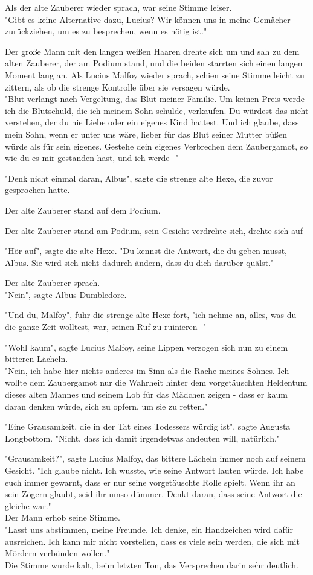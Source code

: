 {Als der alte Zauberer wieder sprach, war seine Stimme leiser.\\ "Gibt es keine Alternative dazu, Lucius? Wir können uns in meine Gemächer zurückziehen, um es zu besprechen, wenn es nötig ist."

Der große Mann mit den langen weißen Haaren drehte sich um und sah zu dem alten Zauberer, der am Podium stand, und die beiden starrten sich einen langen Moment lang an. Als Lucius Malfoy wieder sprach, schien seine Stimme leicht zu zittern, als ob die strenge Kontrolle über sie versagen würde.\\ "Blut verlangt nach Vergeltung, das Blut meiner Familie. Um keinen Preis werde ich die Blutschuld, die ich meinem Sohn schulde, verkaufen. Du würdest das nicht verstehen, der du nie Liebe oder ein eigenes Kind hattest. Und ich glaube, dass mein Sohn, wenn er unter uns wäre, lieber für das Blut seiner Mutter büßen würde als für sein eigenes. Gestehe dein eigenes Verbrechen dem Zaubergamot, so wie du es mir gestanden hast, und ich werde -"

"Denk nicht einmal daran, Albus", sagte die strenge alte Hexe, die zuvor gesprochen hatte.

Der alte Zauberer stand auf dem Podium.

Der alte Zauberer stand am Podium, sein Gesicht verdrehte sich, drehte sich auf -

"Hör auf", sagte die alte Hexe. "Du kennst die Antwort, die du geben musst, Albus. Sie wird sich nicht dadurch ändern, dass du dich darüber quälst."

Der alte Zauberer sprach.\\ "Nein", sagte Albus Dumbledore.

"Und du, Malfoy", fuhr die strenge alte Hexe fort, "ich nehme an, alles, was du die ganze Zeit wolltest, war, seinen Ruf zu ruinieren -"

"Wohl kaum", sagte Lucius Malfoy, seine Lippen verzogen sich nun zu einem bitteren Lächeln.\\ "Nein, ich habe hier nichts anderes im Sinn als die Rache meines Sohnes. Ich wollte dem Zaubergamot nur die Wahrheit hinter dem vorgetäuschten Heldentum dieses alten Mannes und seinem Lob für das Mädchen zeigen - dass er kaum daran denken würde, sich zu opfern, um sie zu retten."

"Eine Grausamkeit, die in der Tat eines Todessers würdig ist", sagte Augusta Longbottom. "Nicht, dass ich damit irgendetwas andeuten will, natürlich."

"Grausamkeit?", sagte Lucius Malfoy, das bittere Lächeln immer noch auf seinem Gesicht. "Ich glaube nicht. Ich wusste, wie seine Antwort lauten würde. Ich habe euch immer gewarnt, dass er nur seine vorgetäuschte Rolle spielt. Wenn ihr an sein Zögern glaubt, seid ihr umso dümmer. Denkt daran, dass seine Antwort die gleiche war."\\ Der Mann erhob seine Stimme.\\ "Lasst uns abstimmen, meine Freunde. Ich denke, ein Handzeichen wird dafür ausreichen. Ich kann mir nicht vorstellen, dass es viele sein werden, die sich mit Mördern verbünden wollen."\\ Die Stimme wurde kalt, beim letzten Ton, das Versprechen darin sehr deutlich.

}
